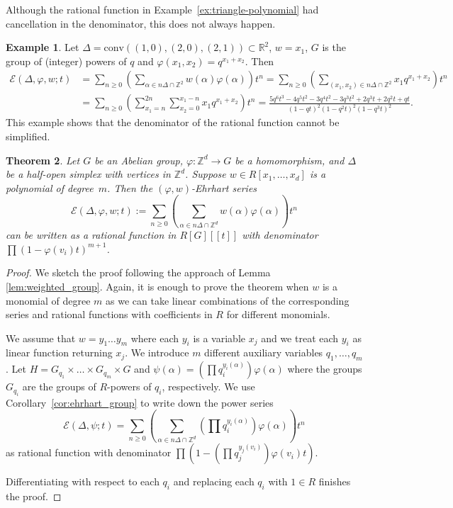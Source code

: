 \documentclass[12pt,reqno]{amsart}
\newtheorem{thm}{Theorem}[section]
\theoremstyle{definition}
\newtheorem{exam}[thm]{Example}
\theoremstyle{remark}
\newcommand{\conv}{\mathrm{conv}}
\newcommand{\R}{\mathbb{R}}
\newcommand{\Z}{\mathbb{Z}}
\renewcommand{\phi}{\varphi}
\begin{document}
Although the rational function in Example~\ref{ex:triangle-polynomial} had cancellation in the denominator, this does not always happen.

\begin{exam}\label{ex:polynomial-weights}
Let $\Delta=\conv((1,0),(2,0),(2,1))\subset \R^2$, $w=x_1$, $G$ is the group of (integer) powers of $q$ and $\phi(x_1,x_2)=q^{x_1+x_2}$. Then
\[\begin{aligned}
\mathcal E(\Delta,\phi,w;t) &=\sum_{n\geq 0} \left(\sum_{\alpha\in n\Delta\cap \Z^2}w(\alpha)\phi(\alpha)\right)t^n
= \sum_{n\geq 0} \left(\sum_{(x_1,x_2)\in n\Delta\cap \Z^2}x_1q^{x_1+x_2}\right)t^n\\
&= \sum_{n\geq 0} \left(\sum_{x_1=n}^{2n}\sum_{x_2=0}^{x_1-n}x_1q^{x_1+x_2}\right)t^n 
=\frac{5 q^6 t^3-4 q^5 t^2-3 q^4 t^2-3 q^3 t^2+2 q^3 t+2 q^2 t+q t}{(1-q t)^2 (1-q^2 t)^2 (1-q^3 t)^2}.
\end{aligned}\]
This example shows that the denominator of the rational function cannot be simplified.
\end{exam}

\begin{thm}\label{thm:weighted-phi}
Let $G$ be an Abelian group, $\phi:\Z^d\to G$ be a homomorphism, and $\Delta$ be a half-open simplex with vertices in $\Z^d$. Suppose $w\in R[x_1,\ldots,x_d]$ is a polynomial of degree~$m$. Then 
the $(\phi,w)$-Ehrhart series 
$$\mathcal E(\Delta,\phi,w;t):=\sum_{n\geq 0} \left(\sum_{\alpha\in n\Delta\cap \Z^d}w(\alpha)\phi(\alpha)\right)t^n$$
can be written as a rational function in $R[G][[t]]$ with denominator $\prod (1-\phi(v_i)t)^{m+1}$. 
\end{thm}
\begin{proof}
We sketch the proof following the approach of Lemma \ref{lem:weighted_group}. Again, it is enough to prove the theorem when $w$ is a monomial of degree $m$ as we can take linear combinations of the corresponding series and rational functions with coefficients in $R$ for different monomials.

We assume that $w=y_1\ldots y_m$ where each $y_i$ is a variable $x_j$ and we treat each $y_i$ as linear function returning $x_j$. We introduce $m$ different auxiliary variables $q_1,\ldots, q_m$. Let $H=G_{q_1}\times\ldots \times G_{q_m}\times G$ and $\psi(\alpha)=\left(\prod q_i^{y_i(\alpha)}\right)\phi(\alpha)$ where the groups $G_{q_i}$ are the groups of $R$-powers of $q_i$, respectively. We use Corollary~\ref{cor:ehrhart_group} to write down the power series
$$\mathcal E(\Delta,\psi;t)=\sum_{n\geq 0}\left(\sum_{\alpha\in n\Delta\cap \Z^d}\left(\prod q_i^{y_i(\alpha)}\right)\phi(\alpha)\right)t^n$$
as rational function with denominator $\prod (1-\left(\prod q_j^{y_j(v_i)} \right)\phi(v_i)t)$.

Differentiating with respect to each $q_i$ and replacing each $q_i$ with $1\in R$ finishes the proof.
\end{proof}
\end{document}
